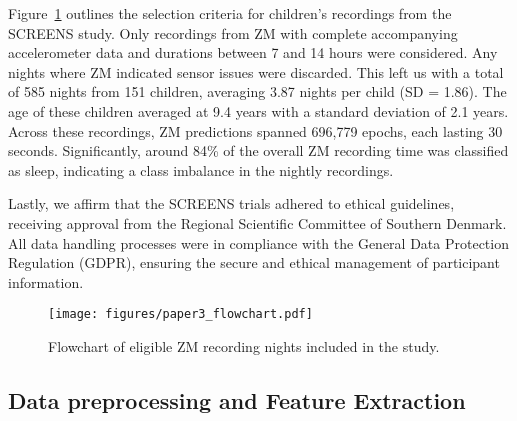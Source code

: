 \documentclass[
  10pt,
]{scrbook}
\begin{document}
Figure~\ref{fig-paper3_flow} outlines the selection criteria for
children's recordings from the SCREENS study. Only recordings from ZM
with complete accompanying accelerometer data and durations between 7
and 14 hours were considered. Any nights where ZM indicated sensor
issues were discarded. This left us with a total of 585 nights from 151
children, averaging 3.87 nights per child (SD = 1.86). The age of these
children averaged at 9.4 years with a standard deviation of 2.1 years.
Across these recordings, ZM predictions spanned 696,779 epochs, each
lasting 30 seconds. Significantly, around 84\% of the overall ZM
recording time was classified as sleep, indicating a class imbalance in
the nightly recordings.

Lastly, we affirm that the SCREENS trials adhered to ethical guidelines,
receiving approval from the Regional Scientific Committee of Southern
Denmark. All data handling processes were in compliance with the General
Data Protection Regulation (GDPR), ensuring the secure and ethical
management of participant information.

\begin{figure}

{\centering \texttt{[image: figures/paper3\_flowchart.pdf]}

}

\caption{\label{fig-paper3_flow}Flowchart of eligible ZM recording
nights included in the study.}

\end{figure}

\hypertarget{data-preprocessing-and-feature-extraction}{%
\subsection{Data preprocessing and Feature
Extraction}\label{data-preprocessing-and-feature-extraction}}
\end{document}
